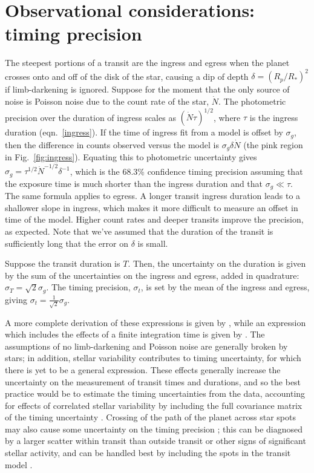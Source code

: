 \documentclass[graybox,natbib,nosecnum]{svmult}
\begin{document}
\section{Observational considerations: timing precision} %

The steepest portions of a transit are the ingress and egress when the planet crosses onto and
off of the disk of the star, causing a dip of depth $\delta = (R_p/R_*)^2$ if limb-darkening is ignored.   
Suppose for the moment that the only source of noise is Poisson noise due to the count rate of 
the star, $\dot N$.  The photometric precision over the duration of ingress scales as
$(\dot N \tau)^{1/2}$, where $\tau$ is the ingress duration (eqn.\ \ref{ingress}).  If the time of 
ingress fit from a model is offset by $\sigma_g$, then the difference in counts observed
versus the model is $\sigma_g \delta \dot N$ (the pink region in Fig.\ \ref{fig:ingress}).  Equating 
this to photometric uncertainty gives $\sigma_g = \tau^{1/2} \dot N^{-1/2} \delta^{-1}$, which
is the 68.3\% confidence timing precision assuming that the exposure time is much shorter than the
ingress duration and that $\sigma_g \ll \tau$.  The same formula applies to egress. A longer transit 
ingress duration leads to a shallower slope in ingress, which makes it more difficult to measure an 
offset in time of the model.  Higher count rates and deeper transits improve the precision, as 
expected.  Note that we've assumed that the duration of the transit is sufficiently long that the 
error on $\delta$ is small.

Suppose the transit duration is $T$.  Then, the uncertainty on the duration is given by
the sum of the uncertainties on the ingress and egress, added in quadrature:
$\sigma_T = \sqrt{2} \sigma_g$.  The timing precision, $\sigma_t$, is set by the mean of the ingress
and egress, giving $\sigma_t = \frac{1}{\sqrt{2}} \sigma_g$.

A more complete derivation of these expressions is given by \citet{2008ApJ...689..499C}, while an 
expression which includes the effects of a finite integration time is given by \citet{2014ApJ...794...92P}.
The assumptions of no limb-darkening and Poisson noise are generally broken by stars;  in addition,
stellar variability contributes to timing uncertainty, for which there is yet to be a general
expression.  These effects generally increase the uncertainty on the measurement of transit times
and durations, and so the best practice would be to estimate the timing uncertainties from the
data, accounting for effects of correlated stellar variability by including the full covariance
matrix of the timing uncertainty \citep{2009ApJ...704...51C,2012MNRAS.419.2683G}.  Crossing of
the path of the planet across star spots may also cause some uncertainty on the timing precision \citep{2013A&A...556A..19O,2013MNRAS.430.3032B};
this can be diagnosed by a larger scatter within transit than outside transit or other signs of
significant stellar activity, and can be handled best by including the spots in the transit model 
\citep{2016A&A...585A..72I}.
\end{document}
